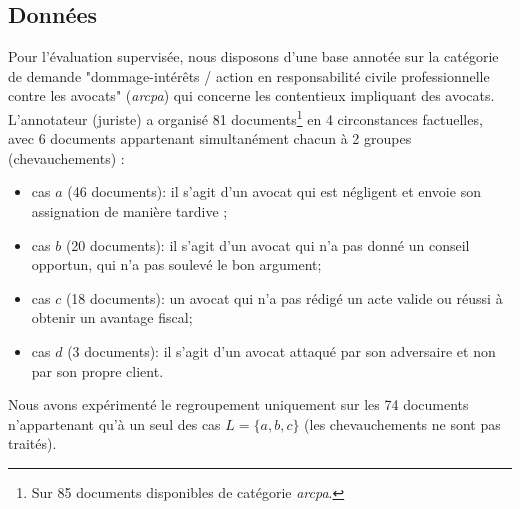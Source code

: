 \subsection{Données}
\label{sec:similarite:données}
Pour l'évaluation supervisée, nous disposons d'une base annotée sur la catégorie de demande "dommage-intérêts / action en responsabilité civile professionnelle contre les avocats" (\textit{arcpa}) qui concerne les contentieux impliquant des avocats.  L'annotateur (juriste) a organisé 81 documents\footnote{Sur 85 documents disponibles de catégorie \textit{arcpa}.} en 4 circonstances factuelles, avec 6 documents appartenant simultanément chacun à 2 groupes (chevauchements) :
\begin{itemize}
\item cas $a$ (46 documents): il s'agit d'un avocat qui est négligent et envoie son assignation de manière tardive ; %
\item cas $b$ (20 documents): il s'agit d'un avocat qui n'a pas donné un conseil opportun, qui n'a pas soulevé le bon argument;
\item cas $c$ (18 documents): un avocat qui n'a pas rédigé un acte valide ou réussi à obtenir un avantage fiscal; %
\item cas $d$ (3 documents): il s'agit d'un avocat attaqué par son adversaire et non par son propre client.
\end{itemize}



Nous avons expérimenté le regroupement uniquement sur les 74 documents n'appartenant qu'à un seul des cas $L = \lbrace a, b, c \rbrace$ (les chevauchements ne sont pas traités).

